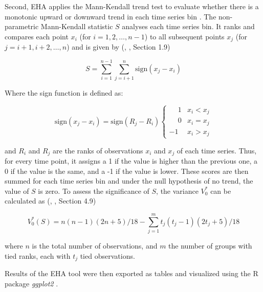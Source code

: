 \bigskip

Second, EHA applies the Mann-Kendall trend test to evaluate whether there is a monotonic upward or
downward trend in each time series bin \citep{mann1945nonparametric,kendall1990rank}. The
non-parametric Mann-Kendall statistic \(S\) analyses each time series bin. It ranks and compares
each point \( x_i \) (for \( i = 1, 2, \ldots, n-1 \)) to all subsequent points \( x_j \) (for \( j
= i+1, i+2, \ldots, n \)) and is given by (\citeauthor{kendall1990rank},
\citeyear{kendall1990rank}, Section 1.9)

\begin{equation}
	S = \sum_{i=1}^{n-1} \sum_{j=i+1}^{n} \text{sign}(x_j - x_i)
\end{equation}

\bigskip

Where the sign function is defined as:

\begin{equation}
	\text{sign}(x_j - x_i) = \text{sign}(R_j - R_i)
	\begin{cases}
		\phantom{-}1 & x_i < x_j \\
		\phantom{-}0 & x_i = x_j \\
		-1           & x_i > x_j
	\end{cases}
\end{equation}

\bigskip

and \(R_i\) and \(R_j\) are the ranks of observations \(x_i\) and \(x_j\) of each time series.
Thus, for every time point, it assigns a 1 if the value is higher than the previous one, a 0 if the
value is the same, and a -1 if the value is lower. These scores are then summed for each time
series bin and under the null hypothesis of no trend, the value of \(S\) is zero. To assess the
significance of \(S\), the variance \(V^*_0\) can be calculated as (\citeauthor{kendall1990rank},
\citeyear{kendall1990rank}, Section 4.9)

\begin{equation}
	V^*_0 (S) = n(n - 1)(2n + 5) / 18 - \sum_{j=1}^{m} t_j(t_j - 1)(2t_j + 5) /18
\end{equation}

\bigskip

where \(n\) is the total number of observations, and \(m\) the number of groups with tied ranks,
each with \(t_j\) tied observations.

\medskip

Results of the EHA tool were then exported as tables and visualized using the R package
\textit{ggplot2} \citep{ggplot2}.